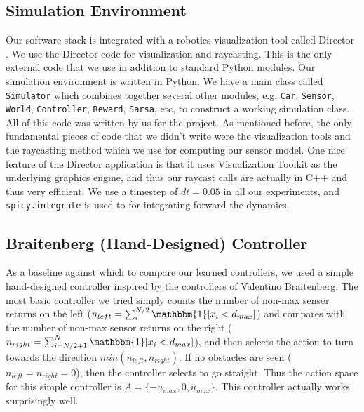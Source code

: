 \documentclass{article}
\def\code#1{\texttt{#1}}
\begin{document}
\subsection{Simulation Environment}

Our software stack is integrated with a robotics visualization tool called Director \cite{director}. We use the Director code for visualization and raycasting. This is the only external code that we use in addition to standard Python modules. Our simulation environment is written in Python. We have a main class called \code{Simulator} which combines together several other modules, e.g. \code{Car}, \code{Sensor}, \code{World}, \code{Controller}, \code{Reward}, \code{Sarsa}, etc, to construct a working simulation class. All of this code was written by us for the project. As mentioned before, the only fundamental pieces of code that we didn't write were the visualization tools and the raycasting method which we use for computing our sensor model. One nice feature of the Director application is that it uses Visualization Toolkit as the underlying graphics engine, and thus our raycast calls are actually in C++ and thus very efficient. We use a timestep of $dt = 0.05$ in all our experiments, and \code{spicy.integrate} is used to for integrating forward the dynamics.

\subsection{Braitenberg (Hand-Designed) Controller}
\label{default_controller}
As a baseline against which to compare our learned controllers, we used a simple hand-designed controller inspired by the controllers of Valentino Braitenberg.  The most basic controller we tried simply counts the number of non-max sensor returns on the left ($n_{left} = \sum_i^{N/2} \mathbbm{1}[x_i < d_{max}]$) and compares with the number of non-max sensor returns on the right ($n_{right} = \sum_{i=N/2+1}^N \mathbbm{1}[x_i < d_{max}]$), and then selects the action to turn towards the direction $min(n_{left}, n_{right})$.  If no obstacles are seen ($n_{left} = n_{right} = 0$), then the controller selects to go straight.  Thus the action space for this simple controller is $A = \{-u_{max}, 0, u_{max} \}$.  This controller actually works surprisingly well.
\end{document}
